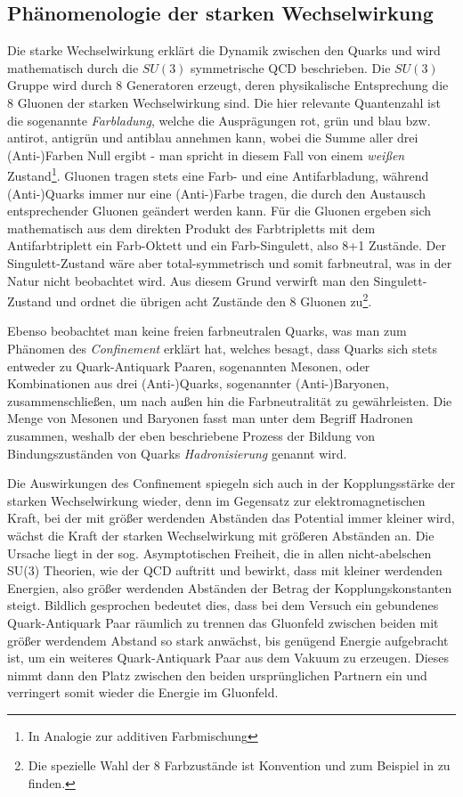 \subsection{Phänomenologie der starken Wechselwirkung}
\label{theory:qcd}
Die starke Wechselwirkung erklärt die Dynamik zwischen den Quarks und wird
mathematisch durch die $SU(3)$ symmetrische \acl{QCD} beschrieben. Die $SU(3)$
Gruppe wird durch 8 Generatoren erzeugt, deren physikalische Entsprechung die 8
Gluonen der starken Wechselwirkung sind. Die hier relevante Quantenzahl ist
die sogenannte \textit{Farbladung}, welche die Ausprägungen rot, grün und blau
bzw. antirot, antigrün und antiblau annehmen kann, wobei die Summe aller drei
(Anti-)Farben Null ergibt - man spricht in diesem Fall von einem
\textit{weißen} Zustand\footnote{In Analogie zur additiven Farbmischung}.
Gluonen tragen stets eine Farb- und eine Antifarbladung, während (Anti-)Quarks
immer nur eine (Anti-)Farbe tragen, die durch den Austausch entsprechender
Gluonen geändert werden kann. Für die Gluonen ergeben sich mathematisch aus dem
direkten Produkt des Farbtripletts mit dem Antifarbtriplett ein Farb-Oktett und
ein Farb-Singulett, also 8+1 Zustände. Der Singulett-Zustand wäre aber
total-symmetrisch und somit farbneutral, was in der Natur nicht beobachtet
wird. Aus diesem Grund verwirft man den Singulett-Zustand und ordnet die
übrigen acht Zustände den 8 Gluonen zu\footnote{Die spezielle Wahl der 8
Farbzustände ist Konvention und zum Beispiel in \cite{Fritzsch:1973pi} zu
finden.}.

Ebenso beobachtet man keine freien farbneutralen Quarks, was man zum Phänomen
des \textit{Confinement} erklärt hat, welches besagt, dass Quarks sich stets
entweder zu Quark-Antiquark Paaren, sogenannten Mesonen, oder Kombinationen aus
drei \mbox{(Anti-)Quarks}, sogenannter (Anti-)Baryonen, zusammenschließen, um
nach außen hin die Farbneutralität zu gewährleisten. Die Menge von Mesonen und
Baryonen fasst man unter dem Begriff Hadronen zusammen, weshalb der eben
beschriebene Prozess der Bildung von Bindungszuständen von Quarks
\textit{Hadronisierung} genannt wird.

Die Auswirkungen des Confinement spiegeln sich auch in der Kopplungsstärke der
starken Wechselwirkung wieder, denn im Gegensatz zur elektromagnetischen Kraft,
bei der mit größer werdenden Abständen das Potential immer kleiner wird, wächst
die Kraft der starken Wechselwirkung mit größeren Abständen an. Die Ursache
liegt in der sog. Asymptotischen Freiheit, die in allen nicht-abelschen SU(3)
Theorien, wie der QCD auftritt und bewirkt, dass mit kleiner werdenden
Energien, also größer werdenden Abständen der Betrag der Kopplungskonstanten
steigt. Bildlich gesprochen bedeutet dies, dass bei dem Versuch ein gebundenes
Quark-Antiquark Paar räumlich zu trennen das Gluonfeld zwischen beiden mit
größer werdendem Abstand so stark anwächst, bis genügend Energie aufgebracht
ist, um ein weiteres Quark-Antiquark Paar aus dem Vakuum zu erzeugen. Dieses
nimmt dann den Platz zwischen den beiden ursprünglichen Partnern ein und
verringert somit wieder die Energie im Gluonfeld.



